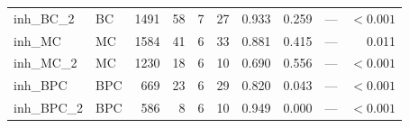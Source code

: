 \begin{table}[t]
\begin{tabular}{llrrrrrrrr}
inh\_BC\_2  & BC   & 1491 & 58  &  7 & 27 & 0.933 & 0.259 & ---           & $< 0.001$ \\
inh\_MC    & MC    & 1584 & 41  &  6 & 33 & 0.881 & 0.415 & ---           & 0.011 \\
inh\_MC\_2  & MC   & 1230 & 18  &  6 & 10 & 0.690 & 0.556 & ---           & $< 0.001$ \\
inh\_BPC   & BPC   &  669 & 23  &  6 & 29 & 0.820 & 0.043 & ---           & $< 0.001$ \\
inh\_BPC\_2 & BPC  &  586 &  8  &  6 & 10 & 0.949 & 0.000 & ---           & $< 0.001$ \\
\bottomrule
\end{tabular}
\end{table}

